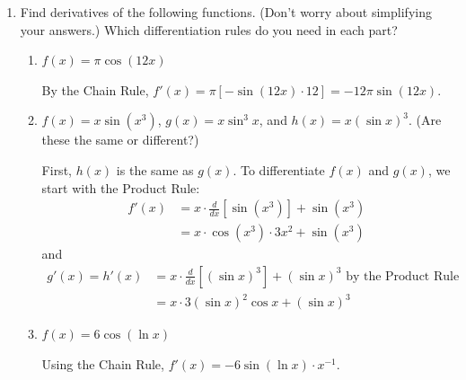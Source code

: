 \documentclass[main]{subfiles}
\begin{document}
\begin{enumerate}[resume]
\item 
 Find derivatives of the
  following functions.  (Don't worry about simplifying your answers.)
  Which differentiation rules do you need in each part? 

  \begin{enumerate}
  \item
    \begin{problem}[\vfill]
      $f(x) = \pi \cos(12 x)$
    \end{problem}

    \begin{solution}
      By the Chain Rule, $f'(x) = \pi [ -\sin(12 x) \cdot 12] = \boxed{-12
        \pi \sin (12x)}$.
    \end{solution}

  \item
    \begin{problem}[\vfill\vfill]
      $f(x) = x \sin \left( x^3 \right)$, $g(x) = x \sin^3 x$, and $h(x) =
      x (\sin x)^3$.  (Are these the same or different?)
    \end{problem}

    \begin{solution}
      First, $h(x)$ is the same as $g(x)$.  To differentiate $f(x)$ and
      $g(x)$, we start with the Product Rule: 
      \begin{align*}
        f'(x) &= x \cdot \frac{d}{dx} \left[ \sin \left( x^3 \right)
        \right] + \sin \left( x^3 \right) \\
        &= \boxed{x \cdot \cos \left(x^3 \right) \cdot 3x^2 + \sin
          \left( x^3 \right)}
      \end{align*}
      and
      \begin{align*}
        g'(x) = h'(x) &= x \cdot \frac{d}{dx} \left[ (\sin x)^3 \right] +
        (\sin x)^3
        \text{ by the Product Rule} \\
         &= \boxed{x \cdot 3 (\sin x)^2 \cos x + (\sin x)^3}
      \end{align*}      
    \end{solution}

  \item
    \begin{problem}[\vfill\newpage]
      $f(x) = 6 \cos (\ln x)$
    \end{problem}

    \begin{solution}
      Using the Chain Rule, $\boxed{f'(x) = -6\sin(\ln x)\cdot x^{-1}}$.
    \end{solution}


\end{enumerate}
\end{enumerate}
\end{document}
